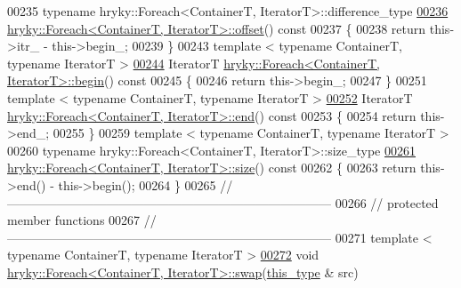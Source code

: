 \begin{DoxyCode}
00235 \textcolor{keyword}{typename} hryky::Foreach<ContainerT, IteratorT>::difference\_type
\hypertarget{foreach_8h_source_l00236}{}\hyperlink{classhryky_1_1_foreach_aab1aceaecb09f71b9ba33ca9ceb49fb1}{00236} \hyperlink{classhryky_1_1_foreach}{hryky::Foreach<ContainerT, IteratorT>::offset}()\textcolor{keyword}{ const}
00237 \textcolor{keyword}{}\{
00238     \textcolor{keywordflow}{return} this->itr\_ - this->begin\_;
00239 \}
00243 \textcolor{keyword}{template} < \textcolor{keyword}{typename} ContainerT, \textcolor{keyword}{typename} IteratorT >
\hypertarget{foreach_8h_source_l00244}{}\hyperlink{classhryky_1_1_foreach_af92e7d3b0f4b07a22856f64ade36f456}{00244} IteratorT \hyperlink{classhryky_1_1_foreach}{hryky::Foreach<ContainerT, IteratorT>::begin}()\textcolor{keyword}{ const}
00245 \textcolor{keyword}{}\{
00246     \textcolor{keywordflow}{return} this->begin\_;
00247 \}
00251 \textcolor{keyword}{template} < \textcolor{keyword}{typename} ContainerT, \textcolor{keyword}{typename} IteratorT >
\hypertarget{foreach_8h_source_l00252}{}\hyperlink{classhryky_1_1_foreach_abc6a85f2269646d8f110df39aff5555e}{00252} IteratorT \hyperlink{classhryky_1_1_foreach}{hryky::Foreach<ContainerT, IteratorT>::end}()\textcolor{keyword}{ const}
00253 \textcolor{keyword}{}\{
00254     \textcolor{keywordflow}{return} this->end\_;
00255 \}
00259 \textcolor{keyword}{template} < \textcolor{keyword}{typename} ContainerT, \textcolor{keyword}{typename} IteratorT >
00260 \textcolor{keyword}{typename} hryky::Foreach<ContainerT, IteratorT>::size\_type 
\hypertarget{foreach_8h_source_l00261}{}\hyperlink{classhryky_1_1_foreach_a4f53055669dda7a72378659f24e21418}{00261} \hyperlink{classhryky_1_1_foreach}{hryky::Foreach<ContainerT, IteratorT>::size}()\textcolor{keyword}{ const}
00262 \textcolor{keyword}{}\{
00263     \textcolor{keywordflow}{return} this->end() - this->begin();
00264 \}
00265 \textcolor{comment}{//
      ------------------------------------------------------------------------------}
00266 \textcolor{comment}{// protected member functions}
00267 \textcolor{comment}{//
      ------------------------------------------------------------------------------}
00271 \textcolor{comment}{}\textcolor{keyword}{template} < \textcolor{keyword}{typename} ContainerT, \textcolor{keyword}{typename} IteratorT >
\hypertarget{foreach_8h_source_l00272}{}\hyperlink{classhryky_1_1_foreach_a3c8dd1fa22806ebb2966caeed1280960}{00272} \textcolor{keywordtype}{void} \hyperlink{namespacehryky_a4282146df5ea2b68cb667896a2205909}{hryky::Foreach<ContainerT, IteratorT>::swap}(\hyperlink{classhryky_1_1_foreach}{this_type} & src)

\end{DoxyCode}
